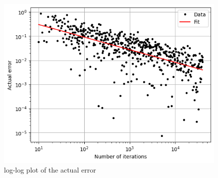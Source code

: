 \documentclass{article}
\begin{document}
\begin{figure}[H]
    \centering
    \includegraphics[width=.7\linewidth]{images/Figure1.1.png}
    \caption{log-log plot of the actual error}
    \label{fig:1}
\end{figure}
\clearpage
\end{document}
